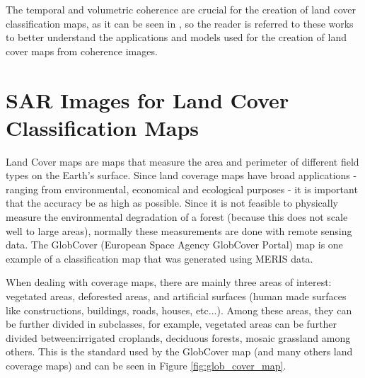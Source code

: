 The temporal and volumetric coherence are crucial for the creation of land cover classification maps, as it can be seen in \cite{Paolo, Rodrigo}, so the reader is referred to these works to better understand the applications and models used for the creation of land cover maps from coherence images.

\section{SAR Images for Land Cover Classification Maps}

Land Cover maps are maps that measure the area and perimeter of different field types on the Earth's surface. Since land coverage maps have broad applications - ranging from environmental, economical and ecological purposes - it is important that the accuracy be as high as possible. Since it is not feasible to physically measure the environmental degradation of a forest (because this does not scale well to large areas), normally these measurements are done with remote sensing data. The GlobCover \cite{globcover, glob} (European Space Agency GlobCover Portal) map is one example of a classification map that was generated using MERIS data.

When dealing with coverage maps, there are mainly three areas of interest: vegetated areas, deforested areas, and artificial surfaces (human made surfaces like constructions, buildings, roads, houses, etc...). Among these areas, they can be further divided in subclasses, for example, vegetated areas can be further divided between:irrigated croplands, deciduous forests, mosaic grassland among others. This is the standard used by the GlobCover map (and many others land coverage maps) and can be seen in Figure \ref{fig:glob_cover_map}.

